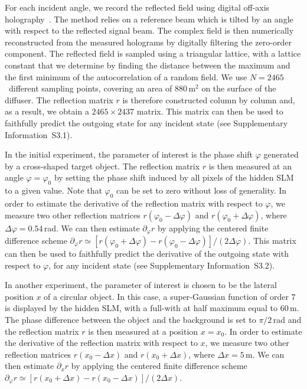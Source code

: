 \documentclass[aps,pra,twocolumn,amsmath,amssymb,superscriptaddress,10pt,nobibnotes]{revtex4-2}
\begin{document}
For each incident angle, we record the reflected field using digital off-axis holography~\cite{takeda_fourier-transform_1982,cuche_spatial_2000}. The method relies on a reference beam which is tilted by an angle with respect to the reflected signal beam. The complex field is then numerically reconstructed from the measured holograms by digitally filtering the zero-order component. The reflected field is sampled using a triangular lattice, with a lattice constant that we determine by finding the distance between the maximum and the first minimum of the autocorrelation of a random field. We use $N=2465$~different sampling points, covering an area of $880$\,\textmu m$^2$ on the surface of the diffuser. The reflection matrix $r$ is therefore constructed column by column and, as a result, we obtain a $2465\times2437$ matrix. This matrix can then be used to faithfully predict the outgoing state for any incident state (see Supplementary Information~S3.1).

In the initial experiment, the parameter of interest is the phase shift $\varphi$ generated by a cross-shaped target object. The reflection matrix $r$ is then measured at an angle $\varphi=\varphi_0$ by setting the phase shift induced by all pixels of the hidden SLM to a given value. Note that $\varphi_0$ can be set to zero without loss of generality. In order to estimate the derivative of the reflection matrix with respect to $\varphi$, we measure two other reflection matrices $r(\varphi_0-\Delta \varphi)$ and $r(\varphi_0+\Delta \varphi)$, where $\Delta \varphi=0.54$\,rad. We can then estimate $\partial_\varphi r$ by applying the centered finite difference scheme $\partial_\varphi r \simeq [r(\varphi_0+\Delta \varphi)-r(\varphi_0-\Delta \varphi)]/(2\Delta \varphi) $. This matrix can then be used to faithfully predict the derivative of the outgoing state with respect to $\varphi$, for any incident state (see Supplementary Information~S3.2).

In another experiment, the parameter of interest is chosen to be the lateral position $x$ of a circular object. In this case, a super-Gaussian function of order $7$ is displayed by the hidden SLM, with a full-with at half maximum equal to $60$\,\textmu m. The phase difference between the object and the background is set to $\pi/2$\,rad and the reflection matrix $r$ is then measured at a position $x=x_0$. In order to estimate the derivative of the reflection matrix with respect to $x$, we measure two other reflection matrices $r(x_0-\Delta x)$ and $r(x_0+\Delta x)$, where $\Delta x=5$\,\textmu m. We can then estimate $\partial_x r$ by applying the centered finite difference scheme $\partial_\varphi r \simeq [r(x_0+\Delta x)-r(x_0-\Delta x)]/(2\Delta x) $.
\end{document}
